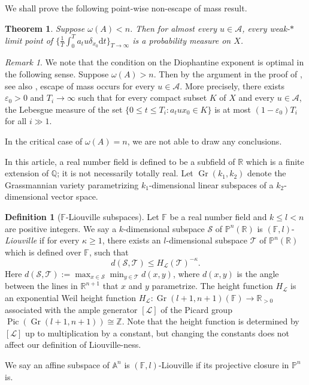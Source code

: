 \documentclass[12pt,reqno]{amsart}
\newcommand{\Gr}{\operatorname{Gr}}
\numberwithin{equation}{section}
\theoremstyle{plain}
\newtheorem{thm}{Theorem}[section]
\theoremstyle{definition}
\newtheorem{definition}{Definition}[section]
\theoremstyle{remark}
\newtheorem{remark}{Remark}[section]
\newcommand\bbA{\mathbb{A}}
\newcommand\bbF{\mathbb{F}}
\newcommand\bbP{\mathbb{P}}
\newcommand\cL{\mathcal{L}}
\newcommand\cS{\mathcal{S}}
\newcommand\cT{\mathcal{T}}
\newcommand{\R}{\mathbb{R}}
\newcommand{\Q}{\mathbb{Q}}
\newcommand{\Z}{\mathbb{Z}}
\newcommand{\eps}{\varepsilon}
\newcommand{\de}{\mathrm{d}}
\begin{document}
	We shall prove the following point-wise non-escape of mass result.
	\begin{thm} \label{thm:main_nondivergence}
		Suppose $\omega(A)<n$. Then for almost every $u\in\mathcal{A}$, every weak-$\ast$ limit point of $\{\frac{1}{T}\int_{0}^{T}a_tu\delta_{x_0}\de t\}_{T\to\infty}$ is a probability measure on $X$.
	\end{thm}
	
	\begin{remark}
		We note that the condition on the Diophantine exponent is optimal in the following sense. Suppose $\omega(A)>n$. Then by the argument in the proof of \cite[Lemma~6.5]{SY24PLMS}, see also \cite[Theorem~1.1]{KSSY}, escape of mass occurs for every $u\in\mathcal{A}$. More precisely, there exists $\eps_0>0$ and $T_i\to\infty$ such that  for every compact subset $K$ of $X$ and every $u\in\mathcal{A}$, the Lebesgue measure of the set $\{0\leq t\leq T_i\colon a_tux_0\in K\}$ is at most $(1-\eps_0)T_i$ for all $i\gg1$. 
        
        In the critical case of $\omega(A)=n$, we are not able to draw any conclusions. 
	\end{remark}

    In this article, a real number field is defined to be a subfield of $\R$ which is a finite extension of $\Q$; it is not necessarily totally real. Let $\Gr(k_1,k_2)$ denote the Grassmannian variety parametrizing $k_1$-dimensional linear subspaces of a $k_2$-dimensional vector space.
    
    \begin{definition}[$\bbF$-Liouville subspaces]  \label{def:F-Liouville}
        Let $\bbF$ be a real number field and $k \leq l < n$ are positive integers. We say a $k$-dimensional subspace $\cS$ of $\bbP^n(\R)$ is $(\bbF, l)$-\emph{Liouville} if for every $\kappa\geq 1$, there exists an $l$-dimensional subspace $\cT$ of $\bbP^n(\R)$ which is defined over $\bbF$, such that
        \begin{equation}
            d(\cS, \cT)\leq H_{\cL}(\cT)^{-\kappa}.
        \end{equation}
        Here $d(\cS, \cT):=\max_{x\in\cS}\min_{y\in\cT}d(x,y)$, where $d(x,y)$ is the angle between the lines in $\R^{n+1}$ that $x$ and $y$ parametrize.
        The height function $H_\cL$ is an exponential Weil height function $H_\cL:\Gr(l+1,n+1)(\bbF)\to\R_{>0}$ associated with the ample generator $[\cL]$ of the Picard group $\operatorname{Pic}(\Gr(l+1,n+1))\cong\Z$. Note that the height function is determined by $[\cL]$ up to multiplication by a constant, but changing the constants does not affect our definition of Liouville-ness. 
        
        We say an affine subspace of $\bbA^n$ is $(\bbF,l)$-Liouville if its projective closure in $\bbP^n$ is.
    \end{definition}
\end{document}
